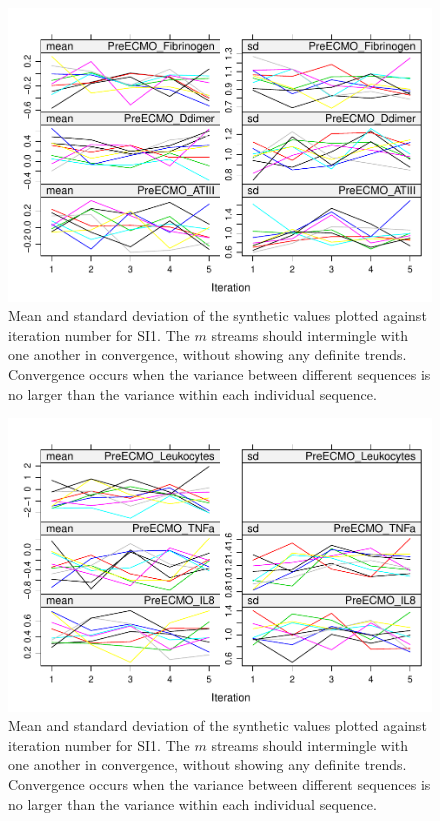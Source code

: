 \documentclass[12pt,]{article}
\begin{document}
\begin{figure}[H]
{\centering \includegraphics[width=0.75\linewidth]{figure/graphics-unnamed-chunk-16-5} 

}

\caption{\label{fig:converge-mean}Mean and standard deviation of the synthetic values plotted against iteration number for SI1.  The $m$ streams should intermingle with one another in convergence, without showing any definite trends.  Convergence occurs when the variance between different sequences is no larger than the variance within each individual sequence.}\label{fig:unnamed-chunk-165}
\end{figure}\begin{figure}[H]

{\centering \includegraphics[width=0.75\linewidth]{figure/graphics-unnamed-chunk-16-6} 

}

\caption{\label{fig:converge-mean}Mean and standard deviation of the synthetic values plotted against iteration number for SI1.  The $m$ streams should intermingle with one another in convergence, without showing any definite trends.  Convergence occurs when the variance between different sequences is no larger than the variance within each individual sequence.}\label{fig:unnamed-chunk-166}
\end{figure}\begin{figure}[H]


\end{figure}
\end{document}
